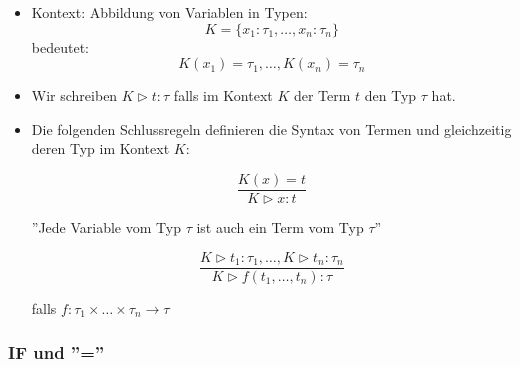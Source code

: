 \documentclass{scrartcl}
\begin{document}
\begin{itemize}
	\item Kontext: Abbildung von Variablen in Typen:
	\begin{equation*}
		K = \{ x_1 : \tau_1, \ldots, x_n : \tau_n \}
	\end{equation*}
	bedeutet:
	\begin{equation*}
		K(x_1) = \tau_1, \ldots, K(x_n) = \tau_n
	\end{equation*}
	\item Wir schreiben $ K \triangleright t : \tau $ falls im Kontext $ K $ der Term $ t $ den Typ $ \tau $ hat.
	\item Die folgenden Schlussregeln definieren die Syntax von Termen und gleichzeitig deren Typ im Kontext $ K $: \\
	
	\begin{minipage}{.5\linewidth}
		\begin{equation*}
		\frac{K(x) = t}{K \triangleright x : t}
		\end{equation*}
	\end{minipage}
	\begin{minipage}{.5\linewidth}
		''Jede Variable vom Typ $ \tau $ ist auch ein Term vom Typ $ \tau $''
	\end{minipage}
	
	\begin{minipage}{.5\linewidth}
		\begin{equation*}
			\frac{K \triangleright t_1 : \tau_1, \ldots, K \triangleright t_n : \tau_n}{K \triangleright f(t_1, \ldots, t_n) : \tau}
		\end{equation*}
	\end{minipage}
	\begin{minipage}{.5\linewidth}
		falls $ f : \tau_1 \times \ldots \times \tau_n \rightarrow \tau $
	\end{minipage}
\end{itemize}

\subsubsection{IF und ''=''}
\end{document}
